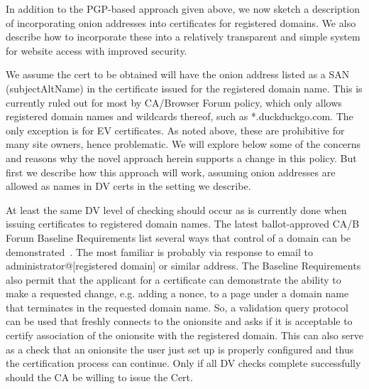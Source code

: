 \documentclass[10pt, conference, compsocconf]{styles/IEEEtran}
\begin{document}
In addition to the PGP-based approach given above,
we now sketch a description of incorporating onion addresses into
certificates for registered domains. We also describe how to
incorporate these into a relatively transparent and simple system for
website access with improved security. 


We assume the cert to be obtained will have the onion address listed
as a SAN (subjectAltName) in the certificate issued for the registered
domain name.  This is currently ruled out for most by CA/Browser Forum policy,
which only allows registered domain names and wildcards thereof, such
as *.duckduckgo.com. The only exception is for EV
certificates.  As noted above, these are prohibitive for many site
owners, hence problematic. We will explore below some of the concerns
and reasons why the novel approach herein supports a change in this
policy. But first we describe how this approach will work, assuming
onion addresses are allowed as names in DV certs in the setting
we describe.

At least the same DV level of checking should occur as is currently
done when issuing certificates to registered domain names. The latest
ballot-approved CA/B Forum Baseline Requirements list several ways
that control of a domain can be demonstrated~\cite{cabforum-br}.  The
most familiar is probably via response to email to
administrator@[registered domain] or similar address.
The Baseline Requirements also permit
that the applicant for a certificate can demonstrate the ability
to make a requested change, e.g. adding a nonce, to a
page under a domain name that terminates in the requested domain name. 
So, a  validation query protocol can be used
that freshly connects to the onionsite and asks if it is acceptable to
certify association of the onionsite with the registered domain.  This
can also serve as a check that an onionsite the user just set up is
properly configured and thus the certification process can continue.
Only if all DV checks complete successfully should the CA be willing
to issue the Cert.
\end{document}
